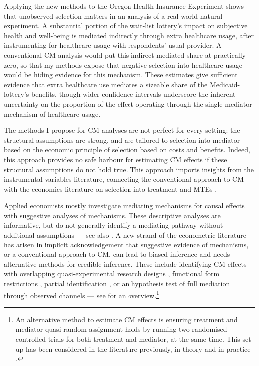 Applying the new methods to the Oregon Health Insurance Experiment shows that unobserved selection matters in an analysis of a real-world natural experiment.
A substantial portion of the wait-list lottery's impact on subjective health and well-being is mediated indirectly through extra healthcare usage, after instrumenting for healthcare usage with respondents' usual provider.
A conventional CM analysis would put this indirect mediated share at practically zero, so that my methods expose that negative selection into healthcare usage would be hiding evidence for this mechanism.
These estimates give sufficient evidence that extra healthcare use mediates a sizeable share of the Medicaid-lottery's benefits, though wider confidence intervals underscore the inherent uncertainty on the proportion of the effect operating through the single mediator mechanism of healthcare usage.

The methods I propose for CM analyses are not perfect for every setting: the structural assumptions are strong, and are tailored to selection-into-mediator based on the economic principle of selection based on costs and benefits.
Indeed, this approach provides no safe harbour for estimating CM effects if these structural assumptions do not hold true.
This approach imports insights from the instrumental variables literature, connecting the conventional \cite{imai2010identification} approach to CM with the economics literature on selection-into-treatment and MTEs \citep{vytlacil2002independence,heckman2004using,heckman2005structural,florens2008identification,brinch2017beyond,kline2019heckits}.

Applied economists mostly investigate mediating mechanisms for causal effects with suggestive analyses of mechanisms.
These descriptive analyses are informative, but do not generally identify a mediating pathway without additional assumptions --- see also \citet{blackwell2024assumption,green2010enough}.
A new strand of the econometric literature has arisen in implicit acknowledgement that suggestive evidence of mechanisms, or a conventional approach to CM, can lead to biased inference and needs alternative methods for credible inference.
These include identifying CM effects with overlapping quasi-experimental research designs \citep{deuchert2019direct,frolich2017direct}, functional form restrictions \citep{heckman2015econometric,heckman2013understanding}, partial identification \citep{flores2009identification}, or an hypothesis test of full mediation through observed channels \citep{kwon2024testing} --- see \cite{huber2019review} for an overview.\footnote{
    An alternative method to estimate CM effects is ensuring treatment and mediator quasi-random assignment holds by running two randomised controlled trials for both treatment and mediator, at the same time.
    This set-up has been considered in the literature previously, in theory \citep{imai2013experimental} and in practice \citep{ludwig2011mechanism}.
}

